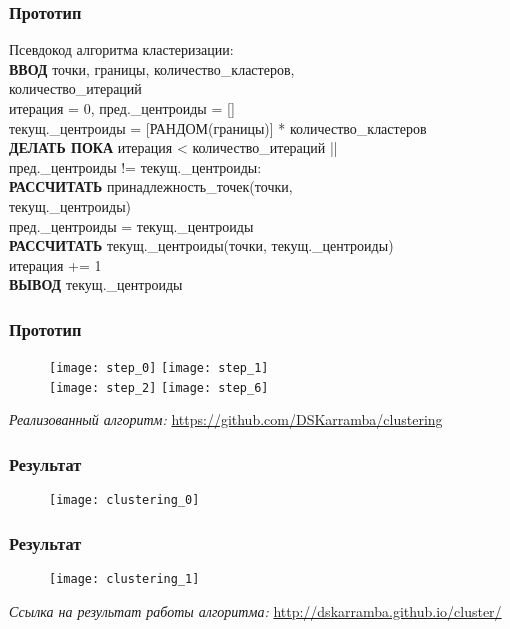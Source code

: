 \begin{frame} %
    \frametitle{Прототип}
    Псевдокод алгоритма кластеризации:\\
    \vspace{1em}
      \footnotesize
      \textbf{ВВОД} точки, границы, количество\_кластеров,\\
        \hspace{.15cm}количество\_итераций\\
      итерация = 0, пред.\_центроиды = []\\
      текущ.\_центроиды = [РАНДОМ(границы)] * количество\_кластеров\\
      \textbf{ДЕЛАТЬ ПОКА} итерация < количество\_итераций
        || \\ \hspace{.15cm} пред.\_центроиды != текущ.\_центроиды:\\
        \hspace{.5cm}\textbf{РАССЧИТАТЬ} принадлежность\_точек(точки,\\
          \hspace{.65cm} текущ.\_центроиды)\\
        \hspace{.5cm} пред.\_центроиды = текущ.\_центроиды\\
        \hspace{.5cm}\textbf{РАССЧИТАТЬ} текущ.\_центроиды(точки,
          текущ.\_центроиды)\\
        \hspace{.5cm} итерация += 1\\
      \textbf{ВЫВОД} текущ.\_центроиды
\end{frame}

\begin{frame} %
    \frametitle{Прототип}
    \begin{figure}
        \texttt{[image: step\_0]} \hfill
        \texttt{[image: step\_1]} \\
        \texttt{[image: step\_2]} \hfill
        \texttt{[image: step\_6]}
    \end{figure}
    \footnotesize\emph{Реализованный алгоритм:}
      \url{https://github.com/DSKarramba/clustering}\\
\end{frame}

\begin{frame} %
    \frametitle{Результат}
    \begin{figure}
        \center
        \texttt{[image: clustering\_0]}
    \end{figure}
    
    \vspace{5ex}
\end{frame}

\begin{frame} %
    \frametitle{Результат}
    \begin{figure}
        \center
        \texttt{[image: clustering\_1]}
    \end{figure}
    
    \footnotesize\emph{Ссылка на результат работы алгоритма:}
      \url{http://dskarramba.github.io/cluster/}
\end{frame}